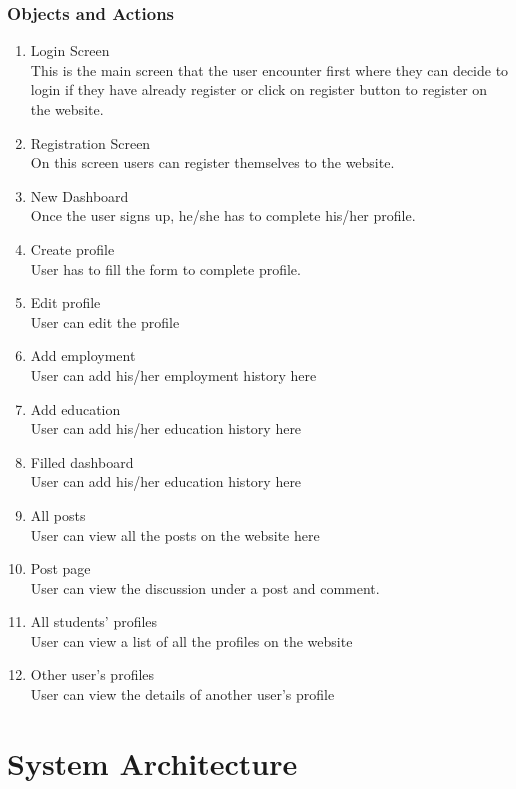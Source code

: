 \documentclass[12pt]{article}
\begin{document}
\pagebreak
\subsubsection{Objects and Actions}
\begin{enumerate}
    \item Login Screen
    \\ This is the main screen that the user encounter first where they can decide to login if they have already register or click on register button to register on the website.
    \item Registration Screen
    \\ On this screen users can register themselves to the website.
    \item New Dashboard
    \\ Once the user signs up, he/she has to complete his/her profile.
    \item Create profile
    \\ User has to fill the form to complete profile.
    \item Edit profile
    \\ User can edit the profile
    \item Add employment
    \\ User can add his/her employment history here
    \item Add education
    \\ User can add his/her education  history here
    \item Filled dashboard
    \\ User can add his/her education  history here
\item All posts
    \\ User can view all the posts on the website here
\item Post page
    \\ User can view the discussion under a post and comment.
\item All students' profiles
    \\ User can view a list of all the profiles on the website
\item Other user's profiles
    \\ User can view the details of another user's profile

\end{enumerate}

\pagebreak

\section{System Architecture}
\end{document}

